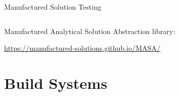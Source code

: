 \documentclass[mathserif]{beamer}
\begin{document}
\begin{frame}{Manufactured Solution Testing}
\begin{columns}[c]
    \end{columns}

    \vspace{5mm}

    Manufactured Analytical Solution Abstraction library:

    \url{https://manufactured-solutions.github.io/MASA/}

\end{frame}


\section{Build Systems}
\end{document}

